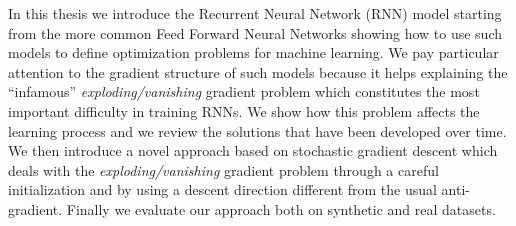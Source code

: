  
In this thesis we introduce the Recurrent Neural Network (RNN) model starting from the more common Feed Forward Neural Networks showing how to use such models to define optimization problems for machine learning. We pay particular attention to the gradient structure of such models because it helps explaining the ``infamous'' \textit{exploding/vanishing} gradient problem which constitutes the most important difficulty in training RNNs. We show how this problem affects the learning process and we review the solutions that have been developed over time. We then introduce a novel approach based on stochastic gradient descent which deals with the \textit{exploding/vanishing} gradient problem through a careful initialization and by using a descent direction different from the usual anti-gradient. Finally we evaluate our approach both on synthetic and real datasets.